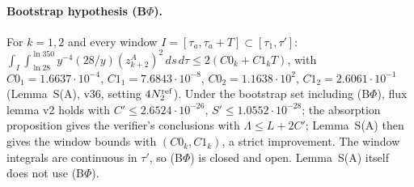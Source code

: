 \paragraph{Bootstrap hypothesis (B$\Phi$).} For $k=1,2$ and every window $I=[\tau_a,\tau_a+T]\subset[\tau_1,\tau']$:
$\int_I\int_{\ln28}^{\ln350}y^{-4}(28/y)(z^A_{k+2})^2\,ds\,d\tau\le2(C0_k+C1_kT)$, with $C0_1=1.6637\cdot10^{-4}$, $C1_1=7.6843\cdot10^{-8}$, $C0_2=1.1638\cdot10^{2}$, $C1_2=2.6061\cdot10^{-1}$ (Lemma~S(A), v36, setting $4N_2^{\rm ref}$).
Under the bootstrap set including (B$\Phi$), flux lemma v2 holds with $C'\le2.6524\cdot10^{-26}$, $S'\le1.0552\cdot10^{-28}$; the absorption proposition gives the verifier's conclusions with $\Lambda\le L+2C'$; Lemma~S(A) then gives the window bounds with $(C0_k,C1_k)$, a strict improvement. The window integrals are continuous in $\tau'$, so (B$\Phi$) is closed and open. Lemma~S(A) itself does not use (B$\Phi$).
